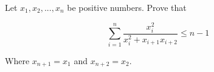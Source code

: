 Let $x_1, x_2, . . . , x_n$ be positive numbers. Prove that

\[ \sum\limits_{i=1}^n \dfrac{x_i ^2}{x_i ^2+x_{i+1}x_{i+2}} \leq n-1 \]

Where $x_{n+1}=x_1$ and $x_{n+2}=x_2$.